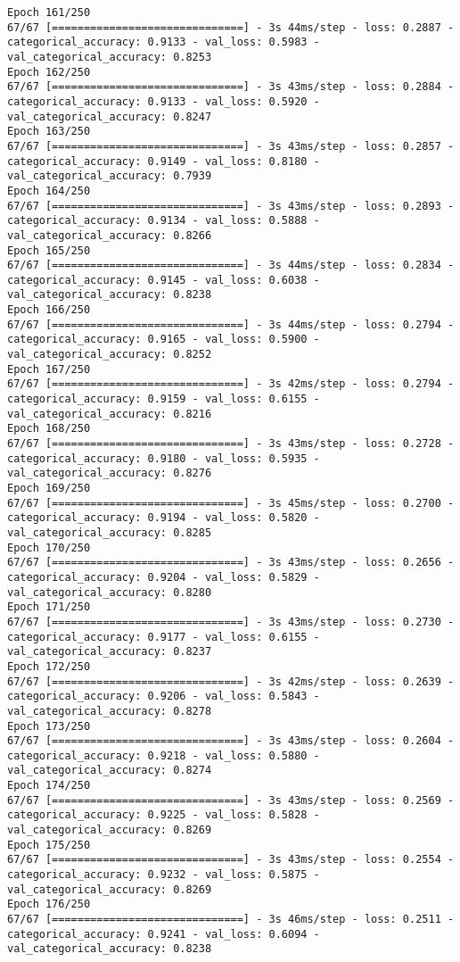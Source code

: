 \begin{lstlisting}
Epoch 161/250
67/67 [==============================] - 3s 44ms/step - loss: 0.2887 - categorical_accuracy: 0.9133 - val_loss: 0.5983 - val_categorical_accuracy: 0.8253
Epoch 162/250
67/67 [==============================] - 3s 43ms/step - loss: 0.2884 - categorical_accuracy: 0.9133 - val_loss: 0.5920 - val_categorical_accuracy: 0.8247
Epoch 163/250
67/67 [==============================] - 3s 43ms/step - loss: 0.2857 - categorical_accuracy: 0.9149 - val_loss: 0.8180 - val_categorical_accuracy: 0.7939
Epoch 164/250
67/67 [==============================] - 3s 43ms/step - loss: 0.2893 - categorical_accuracy: 0.9134 - val_loss: 0.5888 - val_categorical_accuracy: 0.8266
Epoch 165/250
67/67 [==============================] - 3s 44ms/step - loss: 0.2834 - categorical_accuracy: 0.9145 - val_loss: 0.6038 - val_categorical_accuracy: 0.8238
Epoch 166/250
67/67 [==============================] - 3s 44ms/step - loss: 0.2794 - categorical_accuracy: 0.9165 - val_loss: 0.5900 - val_categorical_accuracy: 0.8252
Epoch 167/250
67/67 [==============================] - 3s 42ms/step - loss: 0.2794 - categorical_accuracy: 0.9159 - val_loss: 0.6155 - val_categorical_accuracy: 0.8216
Epoch 168/250
67/67 [==============================] - 3s 43ms/step - loss: 0.2728 - categorical_accuracy: 0.9180 - val_loss: 0.5935 - val_categorical_accuracy: 0.8276
Epoch 169/250
67/67 [==============================] - 3s 45ms/step - loss: 0.2700 - categorical_accuracy: 0.9194 - val_loss: 0.5820 - val_categorical_accuracy: 0.8285
Epoch 170/250
67/67 [==============================] - 3s 43ms/step - loss: 0.2656 - categorical_accuracy: 0.9204 - val_loss: 0.5829 - val_categorical_accuracy: 0.8280
Epoch 171/250
67/67 [==============================] - 3s 43ms/step - loss: 0.2730 - categorical_accuracy: 0.9177 - val_loss: 0.6155 - val_categorical_accuracy: 0.8237
Epoch 172/250
67/67 [==============================] - 3s 42ms/step - loss: 0.2639 - categorical_accuracy: 0.9206 - val_loss: 0.5843 - val_categorical_accuracy: 0.8278
Epoch 173/250
67/67 [==============================] - 3s 43ms/step - loss: 0.2604 - categorical_accuracy: 0.9218 - val_loss: 0.5880 - val_categorical_accuracy: 0.8274
Epoch 174/250
67/67 [==============================] - 3s 43ms/step - loss: 0.2569 - categorical_accuracy: 0.9225 - val_loss: 0.5828 - val_categorical_accuracy: 0.8269
Epoch 175/250
67/67 [==============================] - 3s 43ms/step - loss: 0.2554 - categorical_accuracy: 0.9232 - val_loss: 0.5875 - val_categorical_accuracy: 0.8269
Epoch 176/250
67/67 [==============================] - 3s 46ms/step - loss: 0.2511 - categorical_accuracy: 0.9241 - val_loss: 0.6094 - val_categorical_accuracy: 0.8238

\end{lstlisting}
